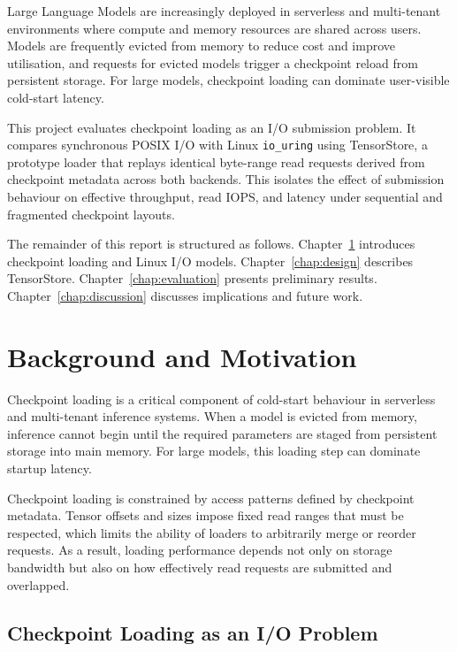 \documentclass[]{final_report}
\begin{document}
Large Language Models are increasingly deployed in serverless and multi-tenant environments where compute and memory resources are shared across users. Models are frequently evicted from memory to reduce cost and improve utilisation, and requests for evicted models trigger a checkpoint reload from persistent storage. For large models, checkpoint loading can dominate user-visible cold-start latency.

This project evaluates checkpoint loading as an I/O submission problem. It compares synchronous POSIX I/O with Linux \texttt{io\_uring} using TensorStore, a prototype loader that replays identical byte-range read requests derived from checkpoint metadata across both backends. This isolates the effect of submission behaviour on effective throughput, read IOPS, and latency under sequential and fragmented checkpoint layouts.

The remainder of this report is structured as follows. Chapter~\ref{chap:background} introduces checkpoint loading and Linux I/O models. Chapter~\ref{chap:design} describes TensorStore. Chapter~\ref{chap:evaluation} presents preliminary results. Chapter~\ref{chap:discussion} discusses implications and future work.



\newpage


\chapter{Background and Motivation}
\label{chap:background}

Checkpoint loading is a critical component of cold-start behaviour in serverless and multi-tenant inference systems. When a model is evicted from memory, inference cannot begin until the required parameters are staged from persistent storage into main memory. For large models, this loading step can dominate startup latency.

Checkpoint loading is constrained by access patterns defined by checkpoint metadata. Tensor offsets and sizes impose fixed read ranges that must be respected, which limits the ability of loaders to arbitrarily merge or reorder requests. As a result, loading performance depends not only on storage bandwidth but also on how effectively read requests are submitted and overlapped.

\section{Checkpoint Loading as an I/O Problem}
\end{document}
